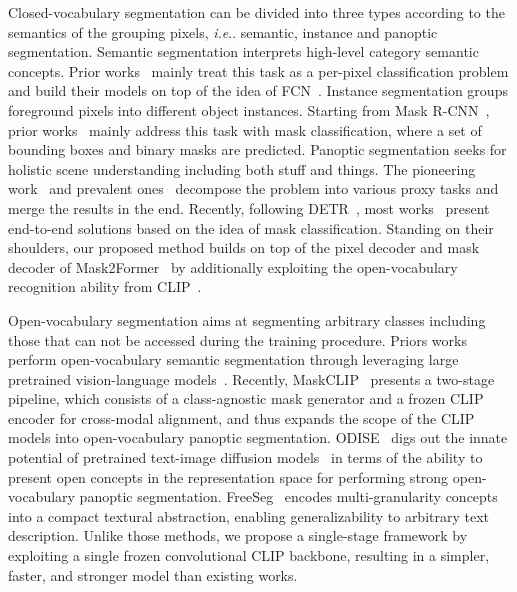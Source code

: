 \documentclass{article}
\makeatletter
\DeclareRobustCommand\onedot{\futurelet\@let@token\@onedot}
\def\@onedot{\ifx\@let@token.\else.\null\fi\xspace}
\def\ie{\emph{i.e}\onedot}
\makeatother
\begin{document}
Closed-vocabulary segmentation can be divided into three types according to the semantics of the grouping pixels, \ie semantic, instance and panoptic segmentation. Semantic segmentation interprets high-level category semantic concepts.
Prior works~\cite{deeplabv12015,ronneberger2015u,chen2018deeplabv2,chen2017deeplabv3,deeplabv3plus2018,fu2019dual,yuan2020object,xie2021segformer,zheng2021rethinking,gu2022multi} mainly treat this task as a per-pixel classification problem and build their models on top of the idea of FCN~\cite{long2014fully}.
Instance segmentation groups foreground pixels into different object instances.
Starting from Mask R-CNN~\cite{he2017mask}, prior works~\cite{kirillov2017instancecut,liu2018path,chen2018masklab,cai2018cascade,yolact,chen2019hybrid,tian2020conditional,wang2020solov2,qiao2021detectors} mainly address this task with mask classification, where a set of bounding boxes and binary masks are predicted.
Panoptic segmentation seeks for holistic scene understanding including both stuff and things. The pioneering work~\cite{kirillov2018panoptic} and prevalent ones~\cite{liu2019e2e,kirillov2019panoptic,xiong2019upsnet,cheng2019panoptic,li2020unifying,wang2020axial,chen2020scaling,qiao2021vip} decompose the problem into various proxy tasks and merge the results in the end.
Recently, following DETR~\cite{carion2020end}, most works~\cite{wang2021max,strudel2021segmenter,cheng2021per,cheng2021masked,li2021panoptic,yu2022cmt,yu2022k,jain2023oneformer,li2023mask,sun2023remax} present end-to-end solutions based on the idea of mask classification.
Standing on their shoulders, our proposed method builds on top of the pixel decoder and mask decoder of Mask2Former~\cite{cheng2021masked}
by additionally exploiting the open-vocabulary recognition ability from CLIP~\cite{radford2021learning}.

Open-vocabulary segmentation aims at segmenting arbitrary classes including those that can not be accessed during the training procedure.
Priors works \cite{li2022language,ghiasi2022scaling,xu2021simple,liang2022open,ding2022decoupling,xu2022groupvit,zhou2022extract,xu2023side,zou2022generalized,ma2022open,zhou2023zegclip,gu2023dataseg} perform open-vocabulary semantic segmentation through leveraging large pretrained vision-language models~\cite{radford2021learning,jia2021scaling,rombach2022high}.
Recently, MaskCLIP~\cite{ding2022open} presents a two-stage pipeline, which consists of a class-agnostic mask generator and a frozen CLIP~\cite{radford2021learning} encoder for cross-modal alignment, and thus expands the scope of the CLIP models into open-vocabulary panoptic segmentation.
ODISE~\cite{xu2023open} digs out the innate potential of pretrained text-image diffusion models~\cite{rombach2022high} in terms of the ability to present open concepts in the representation space for performing strong open-vocabulary panoptic segmentation.
FreeSeg~\cite{qin2023freeseg} encodes multi-granularity concepts into a compact textural abstraction, enabling generalizability to arbitrary text description.
Unlike those methods, we propose a single-stage framework by exploiting a single frozen convolutional CLIP backbone, resulting in a simpler, faster, and stronger model than existing works.
\end{document}

